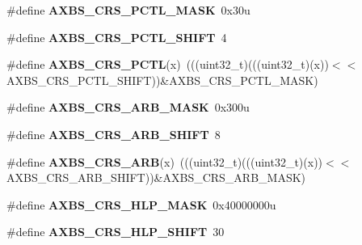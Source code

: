 \begin{DoxyCompactItemize}
\item 
\#define {\bfseries A\+X\+B\+S\+\_\+\+C\+R\+S\+\_\+\+P\+C\+T\+L\+\_\+\+M\+A\+SK}~0x30u\hypertarget{group__AXBS__Register__Masks_gae9582bf93b9b0b8fa349ebb7e61ca312}{}\label{group__AXBS__Register__Masks_gae9582bf93b9b0b8fa349ebb7e61ca312}

\item 
\#define {\bfseries A\+X\+B\+S\+\_\+\+C\+R\+S\+\_\+\+P\+C\+T\+L\+\_\+\+S\+H\+I\+FT}~4\hypertarget{group__AXBS__Register__Masks_ga010aca7f5f083633f9a2e1eb1e9e02e3}{}\label{group__AXBS__Register__Masks_ga010aca7f5f083633f9a2e1eb1e9e02e3}

\item 
\#define {\bfseries A\+X\+B\+S\+\_\+\+C\+R\+S\+\_\+\+P\+C\+TL}(x)~(((uint32\+\_\+t)(((uint32\+\_\+t)(x))$<$$<$A\+X\+B\+S\+\_\+\+C\+R\+S\+\_\+\+P\+C\+T\+L\+\_\+\+S\+H\+I\+FT))\&A\+X\+B\+S\+\_\+\+C\+R\+S\+\_\+\+P\+C\+T\+L\+\_\+\+M\+A\+SK)\hypertarget{group__AXBS__Register__Masks_gaf04c792a7641bdc9a55f66391e78809e}{}\label{group__AXBS__Register__Masks_gaf04c792a7641bdc9a55f66391e78809e}

\item 
\#define {\bfseries A\+X\+B\+S\+\_\+\+C\+R\+S\+\_\+\+A\+R\+B\+\_\+\+M\+A\+SK}~0x300u\hypertarget{group__AXBS__Register__Masks_ga18bef8f761d00bf46b543a96adb7eae3}{}\label{group__AXBS__Register__Masks_ga18bef8f761d00bf46b543a96adb7eae3}

\item 
\#define {\bfseries A\+X\+B\+S\+\_\+\+C\+R\+S\+\_\+\+A\+R\+B\+\_\+\+S\+H\+I\+FT}~8\hypertarget{group__AXBS__Register__Masks_ga1b37d1aff0c53735798f6de4ead2cf16}{}\label{group__AXBS__Register__Masks_ga1b37d1aff0c53735798f6de4ead2cf16}

\item 
\#define {\bfseries A\+X\+B\+S\+\_\+\+C\+R\+S\+\_\+\+A\+RB}(x)~(((uint32\+\_\+t)(((uint32\+\_\+t)(x))$<$$<$A\+X\+B\+S\+\_\+\+C\+R\+S\+\_\+\+A\+R\+B\+\_\+\+S\+H\+I\+FT))\&A\+X\+B\+S\+\_\+\+C\+R\+S\+\_\+\+A\+R\+B\+\_\+\+M\+A\+SK)\hypertarget{group__AXBS__Register__Masks_ga2b01a1d5a44e1d72b164f55cfacdf01b}{}\label{group__AXBS__Register__Masks_ga2b01a1d5a44e1d72b164f55cfacdf01b}

\item 
\#define {\bfseries A\+X\+B\+S\+\_\+\+C\+R\+S\+\_\+\+H\+L\+P\+\_\+\+M\+A\+SK}~0x40000000u\hypertarget{group__AXBS__Register__Masks_gab93f8320945abd915c31020d4d147d33}{}\label{group__AXBS__Register__Masks_gab93f8320945abd915c31020d4d147d33}

\item 
\#define {\bfseries A\+X\+B\+S\+\_\+\+C\+R\+S\+\_\+\+H\+L\+P\+\_\+\+S\+H\+I\+FT}~30\hypertarget{group__AXBS__Register__Masks_ga6cf361c996f63fd5cc169c352971bcd2}{}\label{group__AXBS__Register__Masks_ga6cf361c996f63fd5cc169c352971bcd2}


\end{DoxyCompactItemize}
